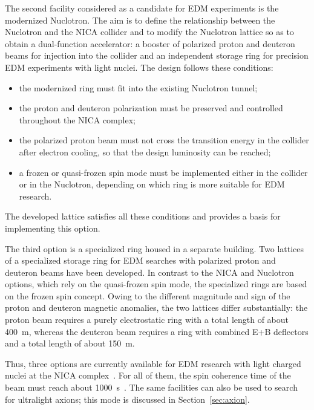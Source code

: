\documentclass[%
  aps,
  pra,
  preprint,
  a4paper,
  amsmath,
  amssymb,
  floatfix,
  longbibliography,
  superscriptaddress
]{revtex4-2}
\begin{document}
The second facility considered as a candidate for EDM experiments is the
modernized Nuclotron. The aim is to define the relationship between the
Nuclotron and the NICA collider and to modify the Nuclotron lattice so as to
obtain a dual-function accelerator: a booster of polarized proton and deuteron
beams for injection into the collider and an independent storage ring for
precision EDM experiments with light nuclei. The design follows these
conditions:
\begin{itemize}
  \item the modernized ring must fit into the existing Nuclotron tunnel;
  \item the proton and deuteron polarization must be preserved and controlled
        throughout the NICA complex;
  \item the polarized proton beam must not cross the transition energy in the
        collider after electron cooling, so that the design luminosity can be
        reached;
  \item a frozen or quasi-frozen spin mode must be implemented either in the
        collider or in the Nuclotron, depending on which ring is more suitable
        for EDM research.
\end{itemize}
The developed lattice satisfies all these conditions and provides a basis
for implementing this option.

The third option is a specialized ring housed in a separate building. Two
lattices of a specialized storage ring for EDM searches with polarized proton
and deuteron beams have been developed. In contrast to the NICA and Nuclotron
options, which rely on the quasi-frozen spin mode, the specialized rings are
based on the frozen spin concept. Owing to the different magnitude and sign of
the proton and deuteron magnetic anomalies, the two lattices differ
substantially: the proton beam requires a purely electrostatic ring with a
total length of about \SI{400}{m}, whereas the deuteron beam requires a ring
with combined E+B deflectors and a total length of about \SI{150}{m}.

Thus, three options are currently available for EDM research with light
charged nuclei at the NICA complex~\cite{Senichev:2024fey,Senichev:2023vtx,Aksentev:2021fsy}. For all of them,
the spin coherence time of the beam must reach about
\SI{1000}{s}~\cite{JEDI:2016swi}. The same facilities can also be used to
search for ultralight axions; this mode is discussed in
Section~\ref{sec:axion}.
\end{document}

